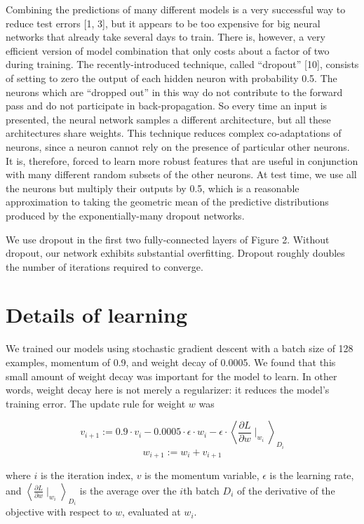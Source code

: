 \documentclass[12pt,a4paper,UTF8,twoside]{book}
\begin{document}
Combining the predictions of many different models is a very successful way to reduce test errors {[}1, 3{]}, but it appears to be too expensive for big neural networks that already take several days to train. There is, however, a very efficient version of model combination that only costs about a factor of two during training. The recently-introduced technique, called ``dropout'' {[}10{]}, consists of setting to zero the output of each hidden neuron with probability 0.5. The neurons which are ``dropped out'' in this way do not contribute to the forward pass and do not participate in back-propagation. So every time an input is presented, the neural network samples a different architecture, but all these architectures share weights. This technique reduces complex co-adaptations of neurons, since a neuron cannot rely on the presence of particular other neurons. It is, therefore, forced to learn more robust features that are useful in conjunction with many different random subsets of the other neurons. At test time, we use all the neurons but multiply their outputs by 0.5, which is a reasonable approximation to taking the geometric mean of the predictive distributions produced by the exponentially-many dropout networks.

We use dropout in the first two fully-connected layers of Figure 2. Without dropout, our network exhibits substantial overfitting. Dropout roughly doubles the number of iterations required to converge.

\hypertarget{details-of-learning}{%
\section{Details of learning}\label{details-of-learning}}

We trained our models using stochastic gradient descent with a batch size of 128 examples, momentum of 0.9, and weight decay of 0.0005. We found that this small amount of weight decay was important for the model to learn. In other words, weight decay here is not merely a regularizer: it reduces the model's training error. The update rule for weight \(w\) was

\[
v_{i+1} := 0.9 \cdot v_i - 0.0005 \cdot \epsilon \cdot w_i - \epsilon \cdot \left\langle \frac{\partial L}{\partial w} \mid_{w_i} \right\rangle _{D_i}
\]
\[
w_{i+1} := w_i + v_{i+1}
\]

where \(i\) is the iteration index, \(v\) is the momentum variable, \(\epsilon\) is the learning rate, and \(\left\langle \frac{\partial L}{\partial w} \mid_{w_i} \right\rangle _{D_i}\) is the average over the \(i\)th batch \(D_i\) of the derivative of the objective with respect to \(w\), evaluated at \(w_i\).
\end{document}
